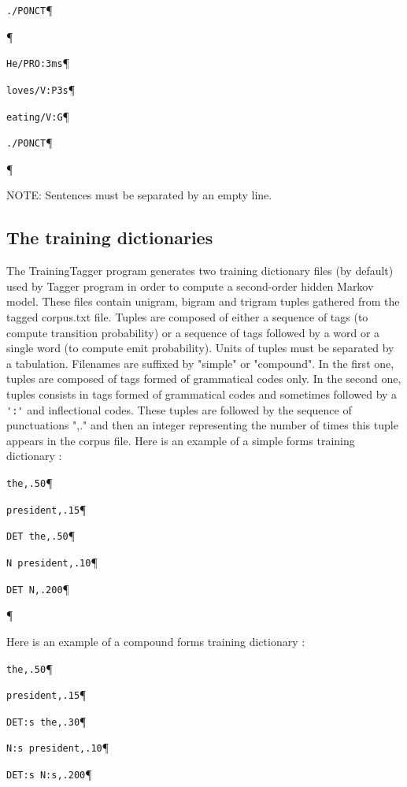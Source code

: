 \verb+./PONCT+\P

\P

\verb+He/PRO:3ms+\P

\verb+loves/V:P3s+\P

\verb+eating/V:G+\P

\verb+./PONCT+\P

\P

\bigskip
\noindent NOTE: Sentences must be separated by an empty line.


\subsection{The training dictionaries}
\label{section-training-dict}
The TrainingTagger program generates two training dictionary files (by default) used by Tagger program in order
to compute a second-order hidden Markov model. 
These files contain unigram, bigram and trigram tuples gathered from the tagged corpus.txt file. Tuples are
composed of either a sequence of tags (to compute transition probability) or a sequence of tags followed by a word or a single word (to compute
emit probability). Units of tuples must be separated by a tabulation. Filenames are suffixed by "simple" or "compound". In the first one, tuples are composed of tags formed of grammatical codes only. In the second one,
tuples consists in tags formed of grammatical codes and sometimes followed by a \verb+':'+ and inflectional codes.
These tuples are followed by the sequence of punctuations ",." and then an integer representing the number of
times this tuple appears in the corpus file.
Here is an example of a simple forms training dictionary : 

\bigskip
\verb+the,.50+\P

\verb+president,.15+\P

\verb+DET the,.50+\P

\verb+N president,.10+\P

\verb+DET N,.200+\P

\P

\bigskip

\noindent Here is an example of a compound forms training dictionary :

\bigskip
\verb+the,.50+\P

\verb+president,.15+\P

\verb+DET:s the,.30+\P

\verb+N:s president,.10+\P

\verb+DET:s N:s,.200+\P


